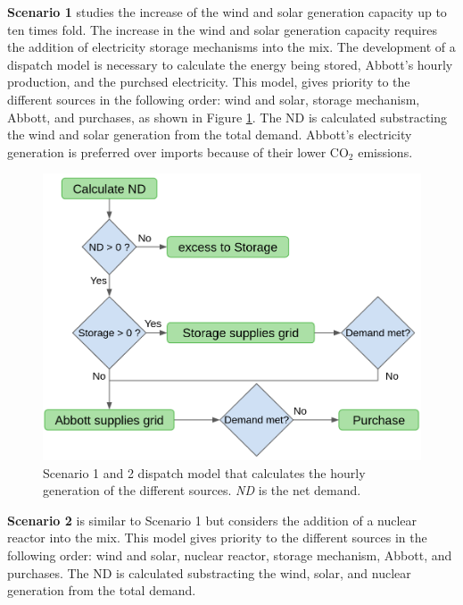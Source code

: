\documentclass{anstrans}
\begin{document}
\textbf{Scenario 1} studies the increase of the wind and solar generation capacity up to ten times fold.
The increase in the wind and solar generation capacity requires the addition of electricity storage mechanisms into the mix.
The development of a dispatch model is necessary to calculate the energy being stored, Abbott's hourly production, and the purchsed electricity.
This model, gives priority to the different sources in the following order: wind and solar, storage mechanism, Abbott, and purchases, as shown in Figure \ref{fig:dispatch-model}.
The \gls{ND} is calculated substracting the wind and solar generation from the total demand.
Abbott’s electricity generation is preferred over imports because of their lower CO$_2$ emissions.

\begin{figure}[htbp!] %
    \centering
    \includegraphics[width=0.90\linewidth]{figures/dispatch-model}
    \hfill
    \caption{Scenario 1 and 2 dispatch model that calculates the hourly generation of the different sources. \textit{ND} is the net demand.}
    \label{fig:dispatch-model}
\end{figure}

\textbf{Scenario 2} is similar to Scenario 1 but considers the addition of a nuclear reactor into the mix.
This model gives priority to the different sources in the following order: wind and solar, nuclear reactor, storage mechanism, Abbott, and purchases.
The \gls{ND} is calculated substracting the wind, solar, and nuclear generation from the total demand.


\end{document}
